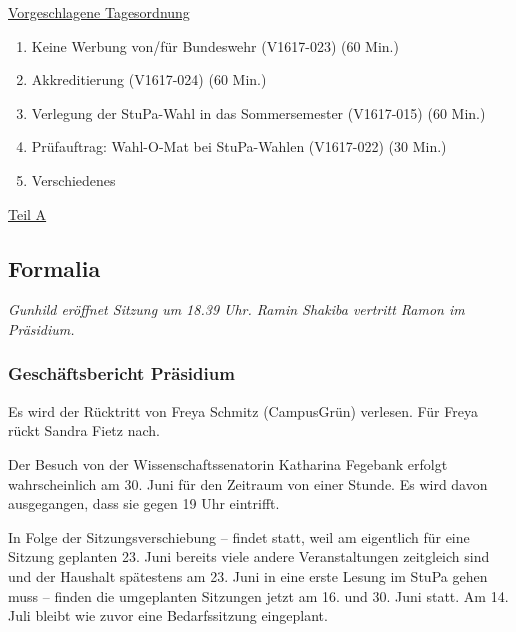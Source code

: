 \documentclass[ngerman,headheight=70pt]{scrartcl}
\begin{document}
    \newpage
    \underline{Vorgeschlagene Tagesordnung}
    \begin{enumerate}[label={\textbf{Top \theenumi}},leftmargin=*]
        \item Keine Werbung von/für Bundeswehr (V1617-023) (60 Min.)
        \item Akkreditierung (V1617-024) (60 Min.)
        \item Verlegung der StuPa-Wahl in das Sommersemester (V1617-015) (60 Min.)
        \item Prüfauftrag: Wahl-O-Mat bei StuPa-Wahlen (V1617-022) (30 Min.)
        \item Verschiedenes
    \end{enumerate}

    \newpage


    {\Large \underline{Teil A}}

    \subsection{Formalia}

    \textit{Gunhild eröffnet Sitzung um 18.39 Uhr. Ramin Shakiba vertritt Ramon
    im Präsidium.}

    \subsubsection{Geschäftsbericht Präsidium}

    Es wird der Rücktritt von Freya Schmitz (CampusGrün) verlesen. Für Freya
    rückt Sandra Fietz nach.

    Der Besuch von der Wissenschaftssenatorin Katharina Fegebank erfolgt
    wahrscheinlich am 30. Juni für den Zeitraum von einer Stunde. Es wird davon
    ausgegangen, dass sie gegen 19 Uhr eintrifft.

    In Folge der Sitzungsverschiebung -- findet statt, weil am eigentlich
    für eine Sitzung geplanten 23. Juni bereits viele andere Veranstaltungen
    zeitgleich sind und der Haushalt spätestens am 23. Juni in eine erste
    Lesung im StuPa gehen muss -- finden die umgeplanten Sitzungen jetzt am
    16. und 30. Juni statt. Am 14. Juli bleibt wie zuvor eine Bedarfssitzung
    eingeplant.
\end{document}
